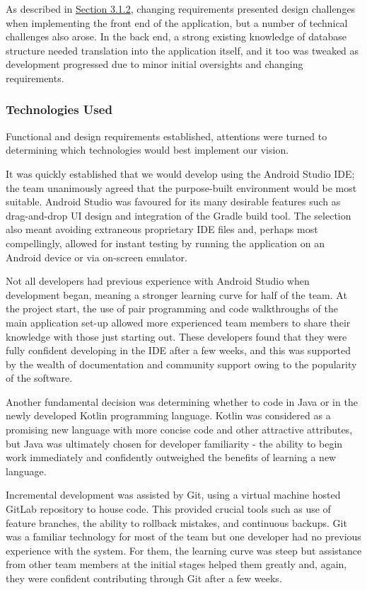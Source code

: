 \documentclass{l3proj}
\begin{document}
As described in \hyperref[sec:3.1.2]{Section 3.1.2}, changing requirements presented design challenges when implementing the front end of the application, but a number of technical challenges also arose. In the back end, a strong existing knowledge of database structure needed translation into the application itself, and it too was tweaked as development progressed due to minor initial oversights and changing requirements. 


\subsubsection{Technologies Used} \label{sec:3.3.1}
Functional and design requirements established, attentions were turned to determining which technologies would best implement our vision. 

It was quickly established that we would develop using the Android Studio IDE; the team unanimously agreed that the purpose-built environment would be most suitable. Android Studio was favoured for its many desirable features such as drag-and-drop UI design and integration of the Gradle build tool. The selection also meant avoiding extraneous proprietary IDE files and, perhaps most compellingly, allowed for instant testing by running the application on an Android device or via on-screen emulator.

Not all developers had previous experience with Android Studio when development began, meaning a stronger learning curve for half of the team. At the project start, the use of pair programming and code walkthroughs \cite{Walkthroughs} of the main application set-up allowed more experienced team members to share their knowledge with those just starting out. These developers found that they were fully confident developing in the IDE after a few weeks, and this was supported by the wealth of documentation and community support owing to the popularity of the software.

Another fundamental decision was determining whether to code in Java or in the newly developed Kotlin programming language. Kotlin was considered as a promising new language with more concise code and other attractive attributes, but Java was ultimately chosen for developer familiarity - the ability to begin work immediately and confidently outweighed the benefits of learning a new language.

Incremental development was assisted by Git, using a virtual machine hosted GitLab repository to house code. This provided crucial tools such as use of feature branches, the ability to rollback mistakes, and continuous backups. Git was a familiar technology for most of the team but one developer had no previous experience with the system. For them, the learning curve was steep but assistance from other team members at the initial stages helped them greatly and, again, they were confident contributing through Git after a few weeks.
\end{document}
